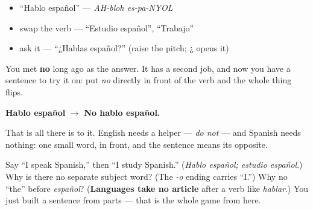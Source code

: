 \begin{itemize}
\raggedright
  \item \textquotedblleft{}Hablo español\textquotedblright{} — \emph{AH-bloh es-pa-NYOL}
  \item swap the verb — \textquotedblleft{}Estudio español\textquotedblright{}, \textquotedblleft{}Trabajo\textquotedblright{}
  \item ask it — \textquotedblleft{}¿Hablas español?\textquotedblright{} (raise the pitch; ¿ opens it)
\end{itemize}

\begin{culture}
You met \textbf{no} long ago as the answer. It has a second job, and now you have a sentence to try it on: put \emph{no} directly in front of the verb and the whole thing flips.

\textbf{Hablo español} $\to$ \textbf{No hablo español.}

That is all there is to it. English needs a helper — \emph{do not} — and Spanish needs nothing: one small word, in front, and the sentence means its opposite.
\end{culture}

\begin{tcolorbox}[breakable,colback=teal!4,colframe=teal!35!black,title={Before you move on}]
Say \textquotedblleft{}I speak Spanish,\textquotedblright{} then \textquotedblleft{}I study Spanish.\textquotedblright{} (\emph{Hablo español; estudio español}.) Why is there no separate subject word? (The \emph{-o} ending carries \textquotedblleft{}I.\textquotedblright{}) Why no \textquotedblleft{}the\textquotedblright{} before \emph{español}? (\textbf{Languages take no article} after a verb like \emph{hablar}.) You just built a sentence from parts — that is the whole game from here.
\end{tcolorbox}
